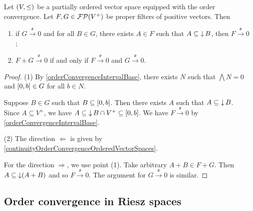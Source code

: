 \begin{lemma} \label{orderConvergencePositiveFilterLemma}
Let $\sSet{V, \leq}$ be a partially ordered vector space equipped with the order convergence. Let $F, G\in\operatorname{\mathcal{FP}}(V^+)$ be proper filters of positive vectors. Then
\begin{enumerate}
\item if $G \overset{\mathfrak{o}}{\longrightarrow} 0$ and for all $B\in G$, there exists $A\in F$ such that $A\subseteq \operatorname{\downarrow} B$, then $F \overset{\mathfrak{o}}{\longrightarrow} 0$;
\item $F+G \overset{\mathfrak{o}}{\longrightarrow} 0$ \textup{if and only if} $F \overset{\mathfrak{o}}{\longrightarrow} 0$ and $G \overset{\mathfrak{o}}{\longrightarrow} 0$.
\end{enumerate}
\end{lemma}
\begin{proof}
(1) By \ref{orderConvergenceIntervalBase}, there exists $N$ such that $\bigwedge N = 0$ and $\interval{0,b} \in G$ for all $b\in N$.

Suppose $B\in G$ such that $B\subseteq \interval{0,b}$. Then there exists $A$ such that $A\subseteq \operatorname{\downarrow} B$. Since $A\subseteq V^+$, we have $A \subseteq \downset B \cap V^+ \subseteq \interval{0,b}$. We have $F \overset{\mathfrak{o}}{\longrightarrow} 0$ by \ref{orderConvergenceIntervalBase}.

(2) The direction $\Leftarrow$ is given by \ref{continuityOrderConvergenceOrderedVectorSpaces}.

For the direction $\Rightarrow$, we use point (1). Take arbitrary $A+B\in F + G$. Then $A\subseteq \operatorname{\downarrow} (A+B)$ and so $F \overset{\mathfrak{o}}{\longrightarrow} 0$. The argument for $G \overset{\mathfrak{o}}{\longrightarrow} 0$ is similar.
\end{proof}

\subsection{Order convergence in Riesz spaces}

